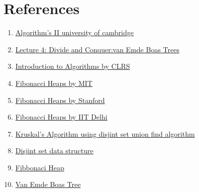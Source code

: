 \documentclass{article}
\begin{document}
\section{References}
\begin{enumerate}
    \item\href{https://www.cl.cam.ac.uk/teaching/1314/AlgorithII/2013-stajano-algs2-students-handout.pdf}{Algorithm's II university of cambridge}
    \item\href{https://ocw.mit.edu/courses/electrical-engineering-and-computer-science/6-046j-design-and-analysis-of-algorithms-spring-2015/lecture-notes/MIT6_046JS15_lec04.pdf}{Lecture 4: Divide and Conquer:van Emde Boas Trees}
    \item\href{https://mcdtu.files.wordpress.com/2017/03/introduction-to-algorithms-3rd-edition-sep-2010.pdf}{Introduction to Algorithms by CLRS}
    \item\href{https://ocw.mit.edu/courses/electrical-engineering-and-computer-science/6-854j-advanced-algorithms-fall-2008/lecture-notes/lec1.pdf}{Fibonacci Heaps by MIT}
    \item\href{http://web.stanford.edu/class/archive/cs/cs166/cs166.1146/lectures/07/Small07.pdf}{Fibonacci Heaps by Stanford}
    \item\href{http://www.cse.iitd.ernet.in/~naveen/courses/CSL630/x02-fiboheap.pdf}{Fibonacci Heaps by IIT Delhi}
    \item\href{https://ocw.mit.edu/courses/electrical-engineering-and-computer-science/6-046j-design-and-analysis-of-algorithms-spring-2012/lecture-notes/MIT6_046JS12_lec04.pdf}{Kruskal's Algorithm using disjint set union find algorithm}
    \item\href{https://en.wikipedia.org/wiki/Disjoint-set_data_structure}{Disjint set data structure}
    \item\href{https://en.wikipedia.org/wiki/Fibonacci_heap}{Fibbonaci Heap}
    \item\href{https://en.wikipedia.org/wiki/Van_Emde_Boas_tree}{Van Emde Boas Tree}
\end{enumerate}
\end{document}
